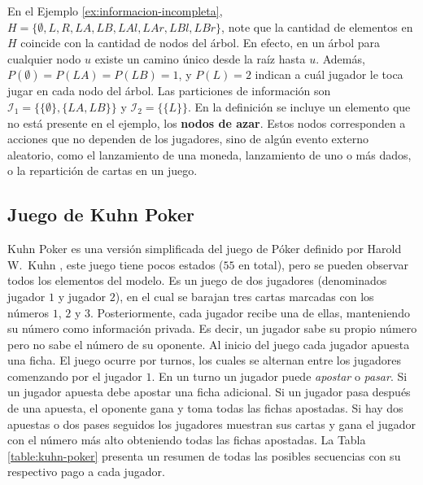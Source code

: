 En el Ejemplo \ref{ex:informacion-incompleta}, $H = \{ \emptyset, L, R, LA, LB, LAl, LAr, LBl, LBr\}$, note que la cantidad de elementos en $H$ coincide con la cantidad de nodos del árbol. En efecto, en un árbol para cualquier nodo $u$ existe un camino único desde la raíz hasta $u$. Además, $P(\emptyset) = P(LA) = P(LB) = 1$, y $P(L) = 2$ indican a cuál jugador le toca jugar en cada nodo del árbol. Las particiones de información son $\mathcal{I}_1 = \{\{\emptyset\}, \{LA, LB\}\}$ y $\mathcal{I}_2  = \{\{L\}\}$. En la definición se incluye un elemento que no está presente en el ejemplo, los \textbf{nodos de azar}. Estos nodos corresponden a acciones que no dependen de los jugadores, sino de algún evento externo aleatorio, como el lanzamiento de una moneda, lanzamiento de uno o más dados, o la repartición de cartas en un juego.

\subsection*{Juego de Kuhn Poker}
\label{section:kuhn-poker}

Kuhn Poker es una versión simplificada del juego de Póker definido por Harold W.\ Kuhn \cite{bib:kuhn-poker}, este juego tiene pocos estados ($55$ en total), pero se pueden observar todos los elementos del modelo. Es un juego de dos jugadores (denominados jugador $1$ y jugador $2$), en el cual se barajan tres cartas marcadas con los números $1$, $2$ y $3$. Posteriormente, cada jugador recibe una de ellas, manteniendo su número como información privada. Es decir, un jugador sabe su propio número pero no sabe el número de su oponente. Al inicio del juego cada jugador apuesta una ficha. El juego ocurre por turnos, los cuales se alternan entre los jugadores comenzando por el jugador $1$. En un turno un jugador puede \textit{apostar} o \textit{pasar}. Si un jugador apuesta debe apostar una ficha adicional. Si un jugador pasa después de una apuesta, el oponente gana y toma todas las fichas apostadas. Si hay dos apuestas o dos pases seguidos los jugadores muestran sus cartas y gana el jugador con el número más alto obteniendo todas las fichas apostadas. La Tabla \ref{table:kuhn-poker} presenta un resumen de todas las posibles secuencias con su respectivo pago a cada jugador.

